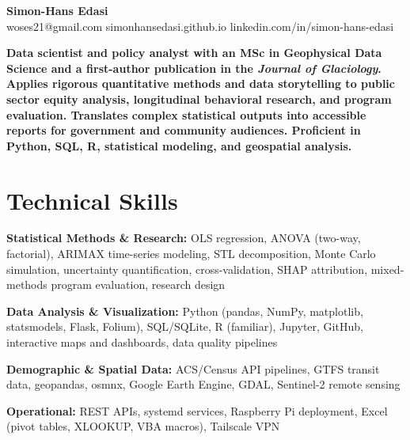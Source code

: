\documentclass[11pt,a4paper]{article}
\begin{document}
\noindent{}

\begin{center}
    {\LARGE \textbf{Simon-Hans Edasi}} \\[6pt]
    woses21@gmail.com \hfill \textbar \hfill
    simonhansedasi.github.io \hfill \textbar \hfill
    linkedin.com/in/simon-hans-edasi
\end{center}

\vspace{0.3cm}

\noindent
\textbf{Data scientist and policy analyst with an MSc in Geophysical Data Science and a first-author publication in the \textit{Journal of Glaciology}. Applies rigorous quantitative methods and data storytelling to public sector equity analysis, longitudinal behavioral research, and program evaluation. Translates complex statistical outputs into accessible reports for government and community audiences. Proficient in Python, SQL, R, statistical modeling, and geospatial analysis.}

\section*{Technical Skills}

\noindent
\textbf{Statistical Methods \& Research:} OLS regression, ANOVA (two-way, factorial), ARIMAX time-series modeling, STL decomposition, Monte Carlo simulation, uncertainty quantification, cross-validation, SHAP attribution, mixed-methods program evaluation, research design

\noindent
\textbf{Data Analysis \& Visualization:} Python (pandas, NumPy, matplotlib, statsmodels, Flask, Folium), SQL/SQLite, R (familiar), Jupyter, GitHub, interactive maps and dashboards, data quality pipelines

\noindent
\textbf{Demographic \& Spatial Data:} ACS/Census API pipelines, GTFS transit data, geopandas, osmnx, Google Earth Engine, GDAL, Sentinel-2 remote sensing

\noindent
\textbf{Operational:} REST APIs, systemd services, Raspberry Pi deployment, Excel (pivot tables, XLOOKUP, VBA macros), Tailscale VPN
\end{document}
